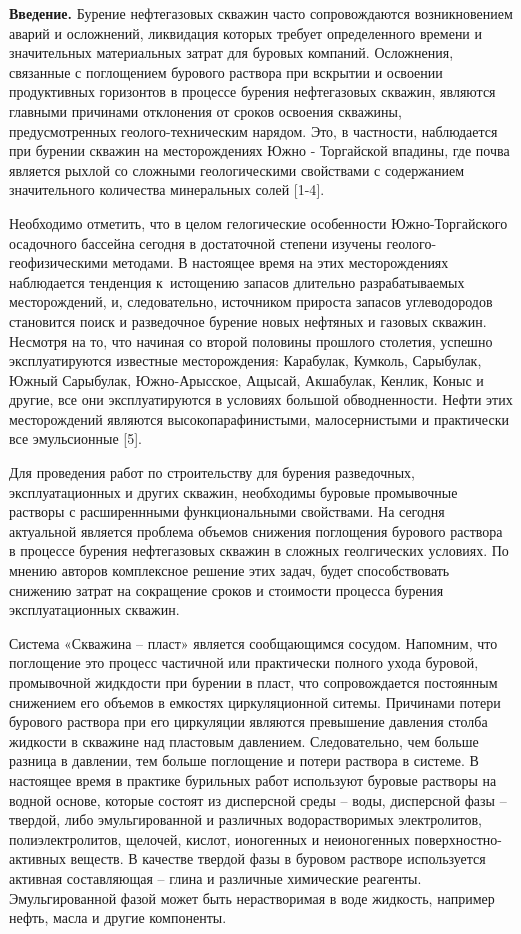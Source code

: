 \begin{multicols}{2}
{\bfseries Введение.} Бурение нефтегазовых скважин часто сопровождаются
возникновением аварий и осложнений, ликвидация которых требует
определенного времени и значительных материальных затрат для буровых
компаний. Осложнения, связанные с поглощением бурового раствора при
вскрытии и освоении продуктивных горизонтов в процессе бурения
нефтегазовых скважин, являются главными причинами отклонения от сроков
освоения скважины, предусмотренных геолого-техническим нарядом. Это, в
частности, наблюдается при бурении скважин на месторождениях Южно -
Торгайской впадины, где почва является рыхлой со сложными геологическими
свойствами с содержанием значительного количества минеральных солей
{[}1-4{]}.

Необходимо отметить, что в целом гелогические особенности
Южно-Торгайского осадочного бассейна сегодня в достаточной степени
изучены геолого-геофизическими методами. В настоящее время на этих
месторождениях наблюдается тенденция к~истощению запасов длительно
разрабатываемых месторождений, и, следовательно, источником прироста
запасов углеводородов становится поиск и разведочное бурение новых
нефтяных и газовых скважин. Несмотря на то, что начиная со второй
половины прошлого столетия, успешно эксплуатируются известные
месторождения: Карабулак, Кумколь, Сарыбулак, Южный Сарыбулак,
Южно-Арысское, Ащысай, Акшабулак, Кенлик, Коныс и другие, все они
эксплуатируются в условиях большой обводненности. Нефти этих
месторождений являются высокопарафинистыми, малосернистыми и практически
все эмульсионные {[}5{]}.

Для проведения работ по строительству для бурения разведочных,
эксплуатационных и других скважин, необходимы буровые промывочные
растворы с расширеннными функциональными свойствами. На сегодня
актуальной является проблема объемов снижения поглощения бурового
раствора в процессе бурения нефтегазовых скважин в сложных геолгических
условиях. По мнению авторов комплексное решение этих задач, будет
способствовать снижению затрат на сокращение сроков и стоимости процесса
бурения эксплуатационных скважин.

Система «Скважина -- пласт» является сообщающимся сосудом. Напомним, что
поглощение это процесс частичной или практически полного ухода буровой,
промывочной жидкдости при бурении в пласт, что сопровождается постоянным
снижением его объемов в емкостях циркуляционной ситемы. Причинами потери
бурового раствора при его циркуляции являются превышение давления столба
жидкости в скважине над пластовым давлением. Следовательно, чем больше
разница в давлении, тем больше поглощение и потери раствора в системе. В
настоящее время в практике бурильных работ используют буровые растворы
на водной основе, которые состоят из дисперсной среды -- воды,
дисперсной фазы -- твердой, либо эмульгированной и различных
водорастворимых электролитов, полиэлектролитов, щелочей, кислот,
ионогенных и неионогенных поверхностно-активных веществ. В качестве
твердой фазы в буровом растворе используется активная составляющая --
глина и различные химические реагенты. Эмульгированной фазой может быть
нерастворимая в воде жидкость, например нефть, масла и другие
компоненты.


\end{multicols}
